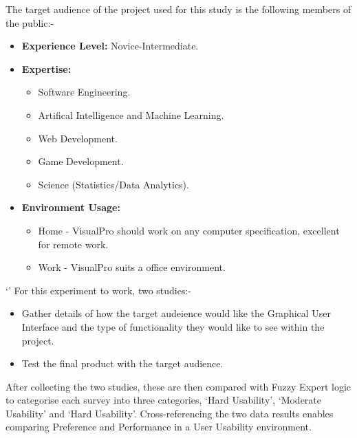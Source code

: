 \documentclass[a0,portrait]{a0poster}
\begin{document}
\begin{multicols}{2}
    The target audience of the project used for this study is the following members of the public:-
    \begin{itemize}
        \item  \textbf{Experience Level:} Novice-Intermediate.
        \item \textbf{Expertise:}
        \begin{itemize}
            \item Software Engineering.
            \item Artifical Intelligence and Machine Learning.
            \item Web Development.
            \item Game Development.
            \item Science (Statistics/Data Analytics).
        \end{itemize}
        \item \textbf{Environment Usage:}
        \begin{itemize}
            \item Home - VisualPro should work on any computer specification, excellent for remote work.
            \item Work - VisualPro suits a office environment.
        \end{itemize}
    \end{itemize}

`'
    For this experiment to work, two studies:-
    \begin{itemize}
        \item Gather details of how the target audeience would like the Graphical User Interface and the type of functionality they would like to see within the project.
        \item Test the final product with the target audience.
    \end{itemize}

    After collecting the two studies, these are then compared with Fuzzy Expert logic to categorise each survey into three categories, `Hard Usability', `Moderate Usability' and `Hard Usability'. Cross-referencing the two data results enables comparing Preference and Performance in a User Usability environment.


\color{DarkSlateGray} %


\end{multicols}
\end{document}
